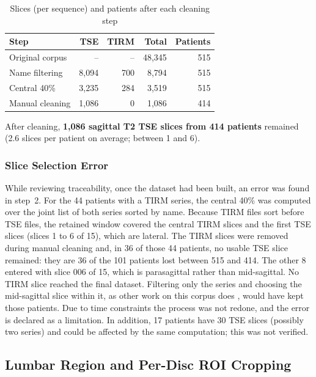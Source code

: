 \begin{table}[!htb]
\centering\footnotesize
\caption{Slices (per sequence) and patients after each cleaning step}
\label{tab:stages}
\begin{tabular}{lrrrr}
\toprule
Step & TSE & TIRM & Total & Patients \\
\midrule
Original corpus & -- & -- & 48,345 & 515 \\
Name filtering & 8,094 & 700 & 8,794 & 515 \\
Central 40\% & 3,235 & 284 & 3,519 & 515 \\
Manual cleaning & 1,086 & 0 & 1,086 & 414 \\
\bottomrule
\end{tabular}
\end{table}

After cleaning, \textbf{1,086 sagittal T2 TSE slices from 414 patients} remained (2.6 slices per patient on average; between 1 and 6).

\subsubsection{Slice Selection Error}
While reviewing traceability, once the dataset had been built, an error was found in step~2. For the 44 patients with a TIRM series, the central 40\% was computed over the joint list of both series sorted by name. Because TIRM files sort before TSE files, the retained window covered the central TIRM slices and the first TSE slices (slices 1 to 6 of 15), which are lateral. The TIRM slices were removed during manual cleaning and, in 36 of those 44 patients, no usable TSE slice remained: they are 36 of the 101 patients lost between 515 and 414. The other 8 entered with slice 006 of 15, which is parasagittal rather than mid-sagittal. No TIRM slice reached the final dataset. Filtering only the  series and choosing the mid-sagittal slice within it, as other work on this corpus does \cite{natalia2024}, would have kept those patients. Due to time constraints the process was not redone, and the error is declared as a limitation. In addition, 17 patients have 30 TSE slices (possibly two series) and could be affected by the same computation; this was not verified.

\subsection{Lumbar Region and Per-Disc ROI Cropping}
\label{sec:roi}

